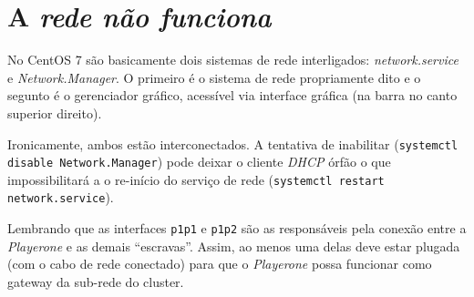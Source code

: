 \chapter{A \textit{rede não funciona}}

No CentOS 7 são basicamente dois sistemas de rede interligados: \textit{network.service} e \textit{Network.Manager}.
O primeiro é o sistema de rede propriamente dito e o segunto é o gerenciador gráfico, acessível via interface gráfica (na barra no canto superior direito).

Ironicamente, ambos estão interconectados. A tentativa de inabilitar (\texttt{systemctl disable Network.Manager}) pode deixar o cliente \textit{DHCP} órfão o que
impossibilitará a o re-início do serviço de rede (\texttt{systemctl restart network.service}).


Lembrando que as interfaces \texttt{p1p1} e \texttt{p1p2} são as responsáveis pela conexão entre a \textit{Playerone} e as demais ``escravas''. Assim, ao menos
uma delas deve estar plugada (com o cabo de rede conectado) para que o \textit{Playerone} possa funcionar como gateway da sub-rede do cluster.

